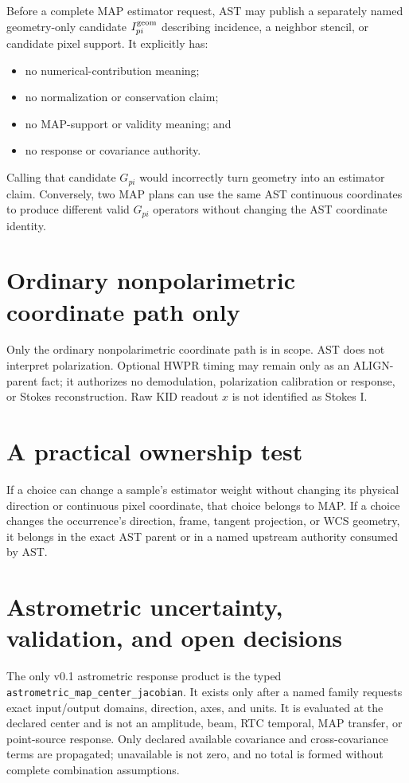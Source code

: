 \documentclass[10pt]{article}
\begin{document}
Before a complete MAP estimator request, AST may publish a separately named
geometry-only candidate $I^{\rm geom}_{pi}$ describing incidence, a neighbor
stencil, or candidate pixel support. It explicitly has:
\begin{itemize}
 \item no numerical-contribution meaning;
 \item no normalization or conservation claim;
 \item no MAP-support or validity meaning; and
 \item no response or covariance authority.
\end{itemize}
Calling that candidate $G_{pi}$ would incorrectly turn geometry into an
estimator claim. Conversely, two MAP plans can use the same AST continuous
coordinates to produce different valid $G_{pi}$ operators without changing
the AST coordinate identity.

\section*{Ordinary nonpolarimetric coordinate path only}
Only the ordinary nonpolarimetric coordinate path is in scope. AST does not
interpret polarization. Optional HWPR timing may remain only as an ALIGN-parent
fact; it authorizes no demodulation, polarization calibration or response, or
Stokes reconstruction. Raw KID readout $x$ is not identified as Stokes I.

\section*{A practical ownership test}
If a choice can change a sample's estimator weight without changing its
physical direction or continuous pixel coordinate, that choice belongs to
MAP. If a choice changes the occurrence's direction, frame, tangent
projection, or WCS geometry, it belongs in the exact AST parent or in a named
upstream authority consumed by AST.

\newpage
\section{Astrometric uncertainty, validation, and open decisions}
The only v0.1 astrometric response product is the typed
\texttt{astrometric\_map\_center\_jacobian}. It exists only after a named
family requests exact input/output domains, direction, axes, and units. It is
evaluated at the declared center and is not an amplitude, beam, RTC temporal,
MAP transfer, or point-source response. Only declared available covariance
and cross-covariance terms are propagated; unavailable is not zero, and no
total is formed without complete combination assumptions.
\end{document}
